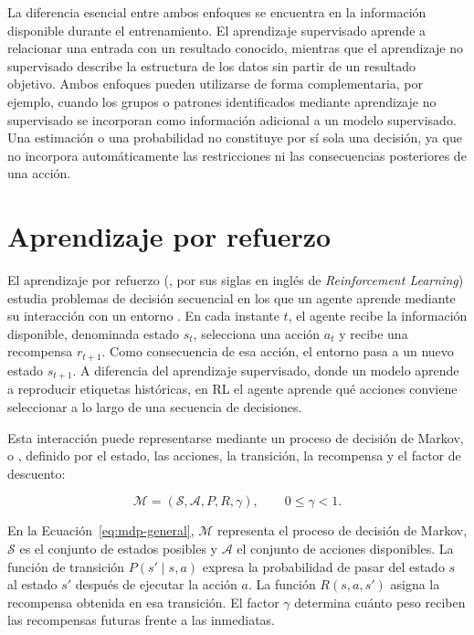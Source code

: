 La diferencia esencial entre ambos enfoques se encuentra en la información disponible durante el entrenamiento. El aprendizaje supervisado aprende a relacionar una entrada con un resultado conocido, mientras que el aprendizaje no supervisado describe la estructura de los datos sin partir de un resultado objetivo. Ambos enfoques pueden utilizarse de forma complementaria, por ejemplo, cuando los grupos o patrones identificados mediante aprendizaje no supervisado se incorporan como información adicional a un modelo supervisado. Una estimación o una probabilidad no constituye por sí sola una decisión, ya que no incorpora automáticamente las restricciones ni las consecuencias posteriores de una acción.

\section{Aprendizaje por refuerzo}
\label{sec:estado-arte-rl}

El aprendizaje por refuerzo (, por sus siglas en inglés de \emph{Reinforcement Learning}) estudia problemas de decisión secuencial en los que un agente aprende mediante su interacción con un entorno \cite{sutton2018reinforcement}. En cada instante $t$, el agente recibe la información disponible, denominada estado $s_t$, selecciona una acción $a_t$ y recibe una recompensa $r_{t+1}$. Como consecuencia de esa acción, el entorno pasa a un nuevo estado $s_{t+1}$. A diferencia del aprendizaje supervisado, donde un modelo aprende a reproducir etiquetas históricas, en RL el agente aprende qué acciones conviene seleccionar a lo largo de una secuencia de decisiones.

Esta interacción puede representarse mediante un proceso de decisión de Markov, o , definido por el estado, las acciones, la transición, la recompensa y el factor de descuento:

\begin{equation}
\mathcal{M}=(\mathcal{S},\mathcal{A},P,R,\gamma),
\qquad 0\leq\gamma<1.
\label{eq:mdp-general}
\end{equation}

En la Ecuación~\ref{eq:mdp-general}, $\mathcal{M}$ representa el proceso de decisión de Markov, $\mathcal{S}$ es el conjunto de estados posibles y $\mathcal{A}$ el conjunto de acciones disponibles. La función de transición $P(s'\mid s,a)$ expresa la probabilidad de pasar del estado $s$ al estado $s'$ después de ejecutar la acción $a$. La función $R(s,a,s')$ asigna la recompensa obtenida en esa transición. El factor $\gamma$ determina cuánto peso reciben las recompensas futuras frente a las inmediatas.

